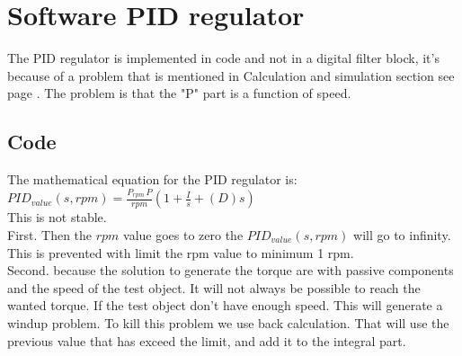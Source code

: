 \newpage
\section{Software PID regulator}

The PID regulator is implemented in code and not in a digital filter block, it's because of a problem that is mentioned in Calculation and simulation section see page \pageref{sec:Calculation_and_Simulation}. The problem is that the "P" part is a function of speed.\\

\subsection{Code}

The mathematical equation for the PID regulator is:\\   

$ PID_{value} \left( s,rpm \right) = {\frac {P_{rpm}\,P}{rpm} \left( 1+{\frac {I}{s}}+ \left( D \right) s \right) } $\\

This is not stable. \\
First. Then the $ rpm $ value goes to zero the $  PID_{value} \left( s,rpm \right) $ will go to infinity. This is prevented with limit the rpm value to minimum 1 rpm.\\
Second. because the solution to generate the torque are with passive components and the speed of the test object. It will not always be possible to reach the wanted torque. If the test object don't have enough speed. This will generate a windup problem. To kill this problem we use back calculation. That will use the previous value that has exceed the limit, and add it to the integral part. 